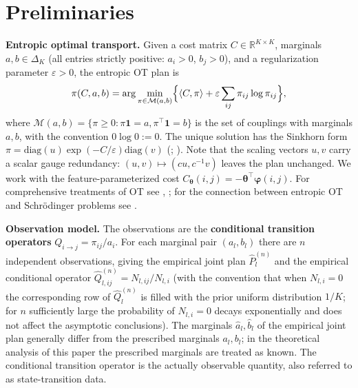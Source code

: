 \documentclass[11pt,a4paper]{article}
\theoremstyle{remark}
\begin{document}
\section{Preliminaries}\label{sec:prelim}

\textbf{Entropic optimal transport.} Given a cost matrix $C\in\mathbb{R}^{K\times K}$,
marginals $a,b\in\Delta_K$ (all entries strictly positive: $a_i>0$, $b_j>0$), and a
regularization parameter $\varepsilon>0$, the entropic OT plan is
\begin{equation}\label{eq:entropic_ot}
\pi(C,a,b)=\arg\min_{\pi\in\mathcal{M}(a,b)}\Bigl\{\langle C,\pi\rangle+\varepsilon\sum_{ij}\pi_{ij}\log\pi_{ij}\Bigr\},
\end{equation}
where $\mathcal{M}(a,b)=\{\pi\ge 0:\pi\mathbf{1}=a,\pi^{\top}\mathbf{1}=b\}$ is the set of
couplings with marginals $a,b$, with the convention $0\log0:=0$. The unique solution has
the Sinkhorn form $\pi=\mathrm{diag}(u)\exp(-C/\varepsilon)\mathrm{diag}(v)$
(\cite{sinkhorn1964coupling}; \cite{cuturi2013sinkhorn}). Note that the scaling vectors
$u,v$ carry a scalar gauge redundancy: $(u,v)\mapsto(cu,c^{-1}v)$ leaves the plan
unchanged. We work with the feature-parameterized cost
$C_{\bm{\theta}}(i,j)=-\bm{\theta}^{\top}\bm{\varphi}(i,j)$. For comprehensive treatments
of OT see \cite{peyre2019computational}, \cite{santambrogio2015ot}; for the connection
between entropic OT and Schr\"odinger problems see \cite{leonard2014schrodinger}.

\textbf{Observation model.} The observations are the \textbf{conditional transition
operators} $Q_{i\to j}=\pi_{ij}/a_i$. For each marginal pair $(a_l,b_l)$ there are $n$
independent observations, giving the empirical joint plan $\widehat P_l^{(n)}$ and the
empirical conditional operator $\widehat Q_{l,ij}^{(n)}=N_{l,ij}/N_{l,i}$ (with the
convention that when $N_{l,i}=0$ the corresponding row of $\widehat Q_l^{(n)}$ is filled
with the prior uniform distribution $1/K$; for $n$ sufficiently large the probability of
$N_{l,i}=0$ decays exponentially and does not affect the asymptotic conclusions). The
marginals $\widehat a_l,\widehat b_l$ of the empirical joint plan generally differ from the
prescribed marginals $a_l,b_l$; in the theoretical analysis of this paper the prescribed
marginals are treated as known. The conditional transition operator is the actually
observable quantity, also referred to as state-transition data.
\end{document}
